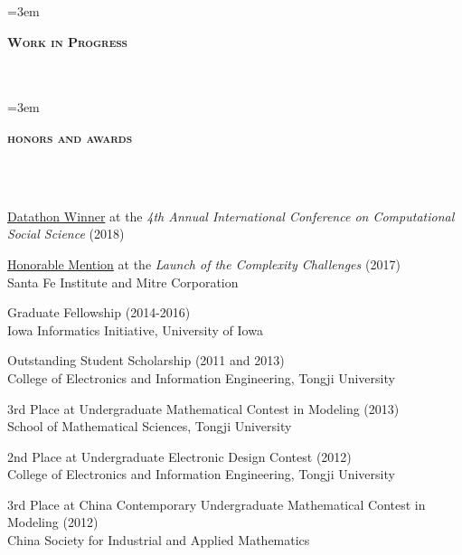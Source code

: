 \documentclass{article}
\newcommand{\header}[1]{{
\hspace*{-15pt}\vspace*{6pt} \textbf{\textsc{\large{#1}}}} \vspace*{-6pt} 
\lineunder
}
\newcommand{\lineunder}{
\vspace*{-8pt} \\ \hspace*{-15pt} 
\hrulefill \\
}
\renewcommand{\labelitemii}{
$\vcenter{\hbox{\tiny$\bullet$}}$\hspace*{-3pt}
}
\newenvironment{bullet-list-major}{
\begin{list}{\labelitemii}{\setlength\leftmargin{3pt} 
\topsep 0pt \itemsep -2pt}}{\vspace*{4pt}\end{list}
}
\begin{document}
\nocite{*}
\newrefcontext[labelprefix=S]
\emergencystretch=3em
\printbibliography[keyword={S},heading=none] 

\vspace*{4pt}%
\header{Work in Progress}

\nocite{*}
\newrefcontext[labelprefix=M]
\emergencystretch=3em
\printbibliography[keyword=M,heading=none] 
%



\vspace*{4pt}
\header{honors and awards}
\begin{bullet-list-major}
    \item \href{https://github.com/zhiyzuo/ic2s2_datathon/blob/master/datathon.pdf}{Datathon Winner} at the \textit{4th Annual International Conference on Computational Social Science} (2018)
    \item \href{https://bitbucket.org/zhiyzuo/complexity-challenge/src/master/}{Honorable Mention} at the \textit{Launch of the Complexity Challenges} (2017) \\
    Santa Fe Institute and Mitre Corporation
    \item Graduate Fellowship (2014-2016) \\
    Iowa Informatics Initiative, University of Iowa
    \item Outstanding Student Scholarship (2011 and 2013) \\
    College  of  Electronics  and  Information  Engineering, Tongji  University
    \item 3rd Place at Undergraduate Mathematical Contest in Modeling (2013) \\
    School of Mathematical Sciences, Tongji University
    \item 2nd Place at Undergraduate Electronic Design Contest (2012) \\
    College of Electronics and Information Engineering, Tongji University
    \item 3rd Place at China Contemporary Undergraduate Mathematical Contest in Modeling (2012) \\
    China Society for Industrial and Applied Mathematics
\end{bullet-list-major}
\end{document}
